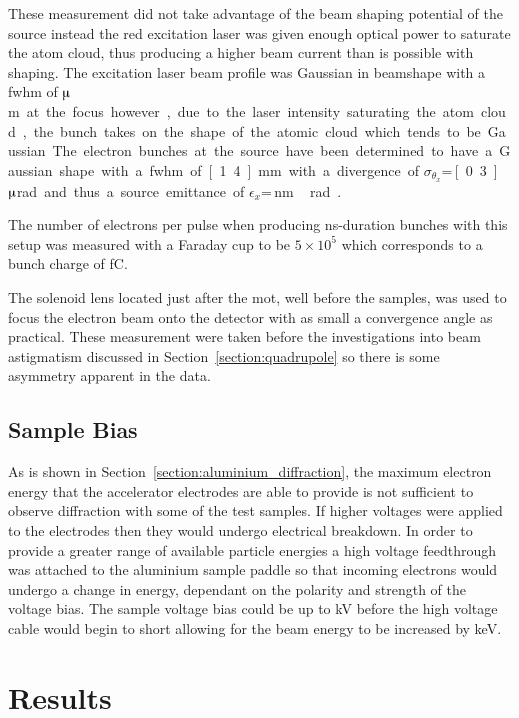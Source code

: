 These measurement did not take advantage of the beam shaping potential of the source instead the red excitation laser was given enough optical power to saturate the atom cloud, thus producing a higher beam current than is possible with shaping.
The excitation laser beam profile was Gaussian in beamshape with a \gls{fwhm} of \unit[80]{$\muup$m} at the focus however, due to the laser intensity saturating the atom cloud, the bunch takes on the shape of the atomic cloud which tends to be Gaussian.
The electron bunches at the source have been determined to have a Gaussian shape with a \gls{fwhm} of \unit[1.4]{mm} with a divergence of $\sigma_{\theta_x}$=\,\unit[0.3]{$\muup$rad} and thus a source emittance of $\epsilon_x$=\,\unit[50]{nm\,rad}~\cite{mcculloch_high-coherence_2013}.

The number of electrons per pulse when producing ns-duration bunches with this setup was measured with a Faraday cup to be $5\times10^5$ which corresponds to a bunch charge of \unit[80]{fC}.

The solenoid lens located just after the \gls{mot}, well before the samples, was used to focus the electron beam onto the detector with as small a convergence angle as practical.
These measurement were taken before the investigations into beam astigmatism discussed in Section~\ref{section:quadrupole} so there is some asymmetry apparent in the data.

\subsection{Sample Bias}\label{section:sample_bias}

As is shown in Section~\ref{section:aluminium_diffraction}, the maximum electron energy that the accelerator electrodes are able to provide is not sufficient to observe diffraction with some of the test samples.
If higher voltages were applied to the electrodes then they would undergo electrical breakdown.
In order to provide a greater range of available particle energies a high voltage feedthrough was attached to the aluminium sample paddle so that incoming electrons would undergo a change in energy, dependant on the polarity and strength of the voltage bias.
The sample voltage bias could be up to \unit[7]{kV} before the high voltage cable would begin to short allowing for the beam energy to be increased by \unit[7]{keV}.

\section{Results}

